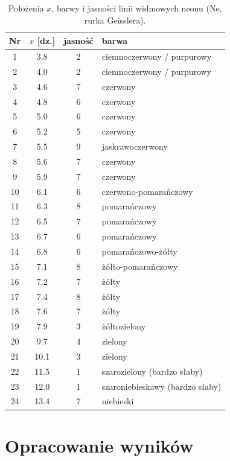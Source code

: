 \documentclass[12pt, a4paper]{article}
\begin{document}
\begin{table}[H]
    \centering
    \caption{Położenia $x$, barwy i jasności linii widmowych neonu (Ne, rurka Geisslera).}\label{tab:raw_ne}
    \begin{tabular}{c S[table-format=2.1] S[table-format=2.0] l}
        \toprule
        Nr & {$x$ [dz.]} & {jasność} & barwa \\
         & 3.8 & 2 & ciemnoczerwony / purpurowy \\
        2 & 4.0 & 2 & ciemnoczerwony / purpurowy \\
        3 & 4.6 & 7 & czerwony \\
        4 & 4.8 & 6 & czerwony \\
        5 & 5.0 & 6 & czerwony \\
        6 & 5.2 & 5 & czerwony \\
        7 & 5.5 & 9 & jaskrawoczerwony \\
        8 & 5.6 & 7 & czerwony \\
        9 & 5.9 & 7 & czerwony \\
        10 & 6.1 & 6 & czerwono-pomarańczowy \\
        11 & 6.3 & 8 & pomarańczowy \\
        12 & 6.5 & 7 & pomarańczowy \\
        13 & 6.7 & 6 & pomarańczowy \\
        14 & 6.8 & 6 & pomarańczowo-żółty \\
        15 & 7.1 & 8 & żółto-pomarańczowy \\
        16 & 7.2 & 7 & żółty \\
        17 & 7.4 & 8 & żółty \\
        18 & 7.6 & 7 & żółty \\
        19 & 7.9 & 3 & żółtozielony \\
        20 & 9.7 & 4 & zielony \\
        21 & 10.1 & 3 & zielony \\
        22 & 11.5 & 1 & szarozielony (bardzo słaby) \\
        23 & 12.0 & 1 & szaroniebieskawy (bardzo słaby) \\
        24 & 13.4 & 7 & niebieski \\
        \bottomrule
    \end{tabular}
\end{table}


\section{Opracowanie wyników}
\end{document}
